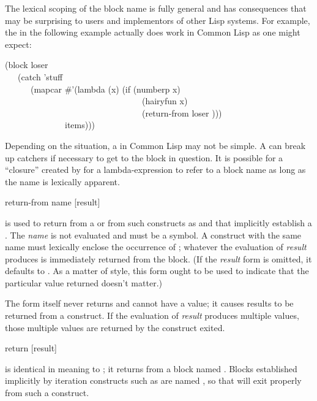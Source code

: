 \begin{defspec}
The lexical scoping of the block name
is fully general and has consequences that may be surprising
to users and implementors of other Lisp systems.
For example, the  in the following example actually does
work in Common Lisp as one might expect:
\begin{lisp}
(block loser \\
~~~(catch 'stuff \\
~~~~~~(mapcar \#'(lambda (x) (if (numberp x) \\
~~~~~~~~~~~~~~~~~~~~~~~~~~~~~~~~(hairyfun x) \\
~~~~~~~~~~~~~~~~~~~~~~~~~~~~~~~~(return-from loser {\nil}))) \\
~~~~~~~~~~~~~~items)))
\end{lisp}
Depending on the situation, a  in Common Lisp
may not be simple.
A  can break up catchers if necessary to get
to the block in question.
It is possible for a ``closure'' created by  for
a lambda-expression to refer to a block name as long as the name
is lexically apparent.
\end{defspec}

\begin{defspec}
return-from name [result]

is used to return from a  or from such constructs
as  and  that implicitly establish a .
The \emph{name} is not evaluated and must be a symbol.
A  construct with the same name must lexically
enclose the occurrence of ;
whatever the evaluation of \emph{result} produces
is immediately returned from the block.
(If the \emph{result} form is omitted, it defaults to {\nil}.
As a matter of style, this form ought to be used to indicate that
the particular value returned doesn't matter.)

The  form itself never returns and cannot have a value;
it causes results to be returned from a  construct.
If the evaluation of \emph{result} produces multiple values,
those multiple values are returned by the construct exited.
\end{defspec}

\begin{defmac}
return [result]

 is identical in meaning
to ; it returns from a block named {\nil}.
Blocks established implicitly by iteration constructs such
as  are named {\nil}, so that  will exit properly from
such a construct.
\end{defmac}

